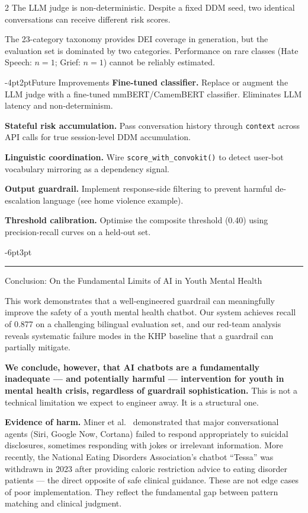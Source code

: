\documentclass[10pt]{article}
\makeatletter
\renewcommand{\section}{\@startsection{section}{1}{\z@}%
  {-6pt}{3pt}{\large\bfseries\color{khpblue}\hrule\vspace{2pt}}}
\renewcommand{\subsection}{\@startsection{subsection}{2}{\z@}%
  {-4pt}{2pt}{\normalsize\bfseries\color{darkgray}}}
\makeatother
\begin{document}
\begin{multicols}{2}
The LLM judge is non-deterministic.
Despite a fixed DDM seed, two identical conversations
can receive different risk scores.

The 23-category taxonomy provides DEI coverage in generation,
but the evaluation set is dominated by two categories.
Performance on rare classes (Hate Speech: $n=1$; Grief: $n=1$)
cannot be reliably estimated.

\subsection{Future Improvements}
\textbf{Fine-tuned classifier.}
Replace or augment the LLM judge with a fine-tuned
mmBERT/CamemBERT classifier. Eliminates LLM latency and non-determinism.

\textbf{Stateful risk accumulation.}
Pass conversation history through \texttt{context}
across API calls for true session-level DDM accumulation.

\textbf{Linguistic coordination.}
Wire \texttt{score\_with\_convokit()} to detect user-bot
vocabulary mirroring as a dependency signal.

\textbf{Output guardrail.}
Implement response-side filtering to prevent harmful
de-escalation language (see home violence example).

\textbf{Threshold calibration.}
Optimise the composite threshold (0.40) using
precision-recall curves on a held-out set.

\section{Conclusion: On the Fundamental Limits of AI in Youth Mental Health}

This work demonstrates that a well-engineered guardrail
can meaningfully improve the safety of a youth mental health chatbot.
Our system achieves recall of 0.877 on a challenging bilingual evaluation set,
and our red-team analysis reveals systematic failure modes in the KHP baseline
that a guardrail can partially mitigate.

\textbf{We conclude, however, that AI chatbots are a fundamentally inadequate
--- and potentially harmful --- intervention for youth in mental health crisis,
regardless of guardrail sophistication.}
This is not a technical limitation we expect to engineer away.
It is a structural one.

\textbf{Evidence of harm.}
Miner et al.\ \cite{miner2016} demonstrated that major conversational agents
(Siri, Google Now, Cortana) failed to respond appropriately to suicidal disclosures,
sometimes responding with jokes or irrelevant information.
More recently, the National Eating Disorders Association's chatbot ``Tessa''
was withdrawn in 2023 after providing caloric restriction advice
to eating disorder patients \cite{neda2023} ---
the direct opposite of safe clinical guidance.
These are not edge cases of poor implementation.
They reflect the fundamental gap between pattern matching and clinical judgment.


\end{multicols}
\end{document}
